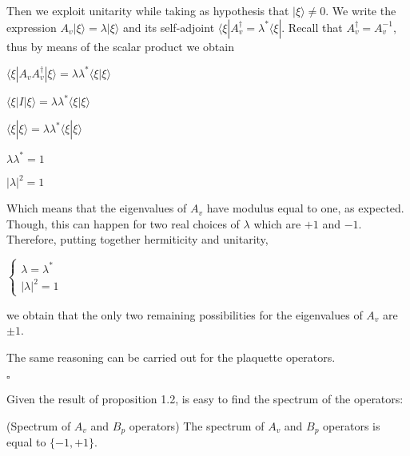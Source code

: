 \documentclass{Configuration_Files/PoliMi3i_thesis}
\begin{document}

Then we exploit unitarity while taking as hypothesis that $|\xi \rangle \neq 0$. 
We write the expression $A_v |\xi \rangle = \lambda |\xi \rangle$ and its self-adjoint $\langle \xi| A_v^{\dagger} = \lambda^* \langle \xi|$. Recall that $A_v^{\dagger}=A_v^{-1}$, thus by means of the scalar product we obtain 

\begin{center}
	$\langle \xi|A_v A_v^{\dagger}|\xi\rangle = \lambda \lambda^* \langle \xi |\xi \rangle$
	
	$\langle \xi|I|\xi \rangle = \lambda \lambda^* \langle \xi |\xi \rangle$
	
	$\langle \xi|\xi \rangle = \lambda \lambda^* \langle \xi |\xi \rangle $
	
	$ \lambda \lambda^* = 1 $
	
	$ |\lambda|^2 = 1 $
\end{center}

Which means that the eigenvalues of $A_v$ have modulus equal to one, as expected. Though, this can happen for two real choices of $\lambda$ which are $+1$ and $-1$.
Therefore, putting together hermiticity and unitarity, 

\begin{center}
$\begin{cases}
	 \lambda = \lambda^* \\
	 |\lambda|^2 = 1 
\end{cases}$
\end{center}

we obtain that the only two remaining possibilities for the eigenvalues of $A_v$ are $\pm 1$. \newline

The same reasoning can be carried out for the plaquette operators.

\hfill $\square$ 

Given the result of proposition 1.2, is easy to find the spectrum of the operators: 

\begin{proposition} (Spectrum of $A_v$ and $B_p$ operators) The spectrum of $A_v$ and $B_p$ operators is equal to $\{-1,+1\}$. 
\end{proposition}
\end{document}
